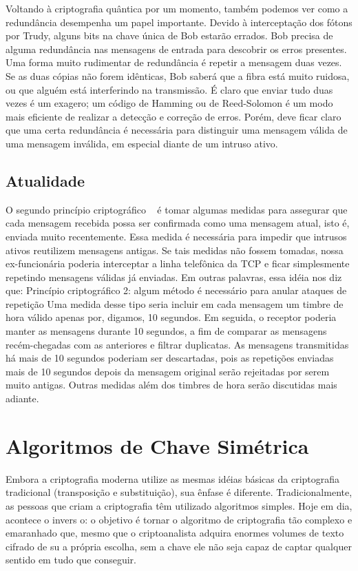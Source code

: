 Voltando à criptografia quântica por um momento, também podemos ver como a redundância
desempenha um papel importante. Devido à interceptação dos fótons por Trudy, alguns bits na
chave única de Bob estarão errados. Bob precisa de alguma redundância nas mensagens de
entrada para descobrir os erros presentes. Uma forma muito rudimentar de redundância é repetir a mensagem duas vezes. Se as duas cópias não forem idênticas, Bob saberá que a fibra está muito
ruidosa, ou que alguém está interferindo na transmissão. É claro que enviar tudo duas vezes é um
exagero; um código de Hamming ou de Reed-Solomon é um modo mais eficiente de realizar a
detecção e correção de erros. Porém, deve ficar claro que uma certa redundância é necessária para
distinguir uma mensagem válida de uma mensagem inválida, em especial diante de um intruso
ativo.

\subsection {Atualidade}

O segundo princípio criptográfico ~\cite{tanenbaum} é tomar algumas medidas para assegurar que cada mensagem recebida possa ser confirmada como uma mensagem atual, isto é, enviada muito recentemente.
Essa medida é necessária para impedir que intrusos ativos reutilizem mensagens antigas. Se tais
medidas não fossem tomadas, nossa ex-funcionária poderia interceptar a linha telefônica da TCP e
ficar simplesmente repetindo mensagens válidas já enviadas. Em outras palavras, essa idéia nos
diz que:
Princípio criptográfico 2: algum método é necessário para anular ataques de repetição
Uma medida desse tipo seria incluir em cada mensagem um timbre de hora válido apenas por,
digamos, 10 segundos. Em seguida, o receptor poderia manter as mensagens durante 10
segundos, a fim de comparar as mensagens recém-chegadas com as anteriores e filtrar duplicatas.
As mensagens transmitidas há mais de 10 segundos poderiam ser descartadas, pois as repetições
enviadas mais de 10 segundos depois da mensagem original serão rejeitadas por serem muito
antigas. Outras medidas além dos timbres de hora serão discutidas mais adiante.


\section {Algoritmos de Chave Simétrica}

Embora a criptografia moderna utilize as mesmas idéias básicas da criptografia tradicional
(transposição e substituição), sua ênfase é diferente. Tradicionalmente, as pessoas que criam a
criptografia têm utilizado algoritmos simples. Hoje em dia, acontece o invers o: o objetivo é tornar o algoritmo de criptografia tão complexo e emaranhado que, mesmo que o criptoanalista adquira
enormes volumes de texto cifrado de su a própria escolha, sem a chave ele não seja capaz de
captar qualquer sentido em tudo que conseguir.


